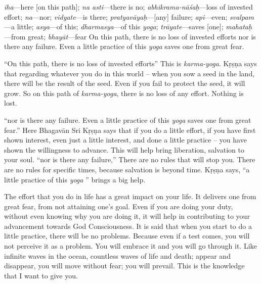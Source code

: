 {%
  \textit{iha}---here [on this path]; 
  \textit{na asti}---there is no; 
  \textit{abhikrama-nāśaḥ}---loss of invested effort; 
  \textit{na}---nor; 
  \textit{vidyate}---is there; 
  \textit{pratyavāyaḥ}---[any] failure; 
  \textit{api}---even; 
  \textit{svalpam}---a little; 
  \textit{asya}---of this; 
  \textit{dharmasya}---of this \textit{yoga}; 
  \textit{trāyate}---saves [one]; 
  \textit{mahataḥ}---from great; 
  \textit{bhayāt}---fear
}
{%
  On this path, there is no loss of invested efforts nor is there any failure. Even a little practice of this \textit{yoga} saves one from great fear.
}

“On this path, there is no loss of invested efforts” This is \textit{karma-yoga}. Kṛṣṇa says that regarding whatever you do in this world – when you sow a seed in the land, there will be the result of the seed. Even if you fail to protect the seed, it will grow. So on this path of \textit{karma-yoga}, there is no loss of any effort. Nothing is lost.

“nor is there any failure. Even a little practice of this \textit{yoga} saves one from great fear.” Here Bhagavān Sri Kṛṣṇa says that if you do a little effort, if you have first shown interest, even just a little interest, and done a little practice – you have shown the willingness to advance. This will help bring liberation, salvation to your soul. “nor is there any failure,” There are no rules that will stop you. There are no rules for specific times, because salvation is beyond time. Kṛṣṇa says, “a little practice of this \textit{yoga} ” brings a big help.

The effort that you do in life has a great impact on your life. It delivers one from great fear, from not attaining one’s goal. Even if you are doing your duty, without even knowing why you are doing it, it will help in contributing to your advancement towards God Consciousness. It is said that when you start to do a little practice, there will be no problems. Because even if a test comes, you will not perceive it as a problem. You will embrace it and you will go through it. Like infinite waves in the ocean, countless waves of life and death; appear and disappear, you will move without fear; you will prevail. This is the knowledge that I want to give you.

